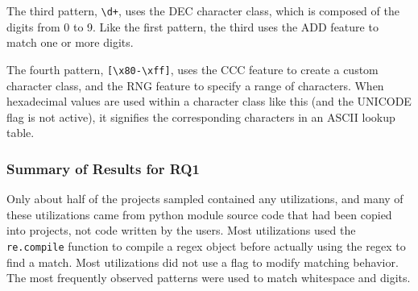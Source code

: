 The third pattern, \verb!\d+!,  uses the DEC character class, which is composed of the digits from 0 to 9.  Like the first pattern, the third uses the ADD feature to match one or more digits.

The fourth pattern, \verb![\x80-\xff]!, uses the CCC feature to create a custom character class, and the RNG feature to specify a range of characters.
When hexadecimal values are used within a character class like this (and the UNICODE flag is not active), it signifies the corresponding characters in an ASCII lookup table.








% 


\subsubsection{Summary of Results for RQ1}
Only about half of the projects sampled contained any utilizations, and many of these utilizations came from python module source code that had been copied into projects, not code written by the users.  Most utilizations used the {\tt re.compile} function to compile a regex object before actually using the regex to find a match.  Most utilizations did not use a flag to modify matching behavior.  The most frequently observed patterns were used to match whitespace and digits.

